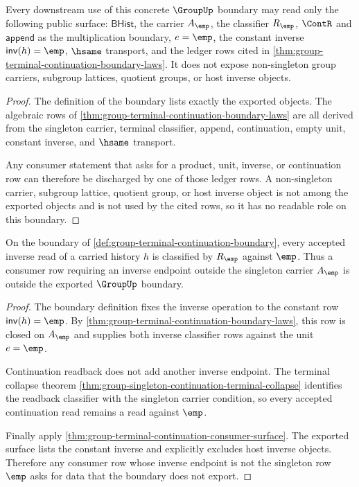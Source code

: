 \begin{theorem}
\label{thm:group-terminal-continuation-consumer-surface}
Every downstream use of this concrete $\GroupUp$ boundary may read only the
following public surface: $\mathsf{BHist}$, the carrier $A_{\emp}$, the
classifier $R_{\emp}$, $\ContR$ and $\mathsf{append}$ as the multiplication
boundary, $e=\emp$, the constant inverse $\mathsf{inv}(h)=\emp$, $\hsame$
transport, and the ledger rows cited in
\autoref{thm:group-terminal-continuation-boundary-laws}. It does not expose
non-singleton group carriers, subgroup lattices, quotient groups, or host
inverse objects.
\end{theorem}
\begin{proof}
The definition of the boundary lists exactly the exported objects. The algebraic
rows of \autoref{thm:group-terminal-continuation-boundary-laws} are all derived
from the singleton carrier, terminal classifier, append, continuation, empty
unit, constant inverse, and $\hsame$ transport.

Any consumer statement that asks for a product, unit, inverse, or continuation
row can therefore be discharged by one of those ledger rows. A non-singleton
carrier, subgroup lattice, quotient group, or host inverse object is not among
the exported objects and is not used by the cited rows, so it has no readable
role on this boundary.
\end{proof}

\begin{theorem}
\label{thm:group-terminal-continuation-inverse-obstruction}
On the boundary of \autoref{def:group-terminal-continuation-boundary}, every
accepted inverse read of a carried history $h$ is classified by $R_{\emp}$
against $\emp$. Thus a consumer row requiring an inverse endpoint outside the
singleton carrier $A_{\emp}$ is outside the exported $\GroupUp$ boundary.
\end{theorem}
\begin{proof}
The boundary definition fixes the inverse operation to the constant row
$\mathsf{inv}(h)=\emp$. By
\autoref{thm:group-terminal-continuation-boundary-laws}, this row is closed on
$A_{\emp}$ and supplies both inverse classifier rows against the unit
$e=\emp$.

Continuation readback does not add another inverse endpoint. The terminal
collapse theorem
\autoref{thm:group-singleton-continuation-terminal-collapse} identifies the
readback classifier with the singleton carrier condition, so every accepted
continuation read remains a read against $\emp$.

Finally apply \autoref{thm:group-terminal-continuation-consumer-surface}. The
exported surface lists the constant inverse and explicitly excludes host
inverse objects. Therefore any consumer row whose inverse endpoint is not the
singleton row $\emp$ asks for data that the boundary does not export.
\end{proof}

